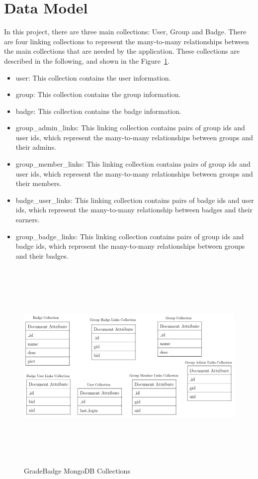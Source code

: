 \section{Data Model}
In this project, there are three main collections: User, Group and Badge.  There are four linking collections to represent the many-to-many relationships between the main collections that are needed by the application.  These collections are described in the following, and shown in the Figure~\ref{fig:db}. 

\begin{itemize}
\item user: This collection contains the user information.
\item group: This collection contains the group information.  
\item badge: This collection contains the badge information.
\item group{\_}admin{\_}links: This linking collection contains pairs of group ids and user ids, which represent the many-to-many relationships between groups and their admins.
\item group{\_}member{\_}links: This linking collection contains pairs of group ids and user ids, which represent the many-to-many relationships between groups and their members.
\item badge{\_}user{\_}links: This linking collection contains pairs of badge ids and user ids, which represent the many-to-many relationship between badges and their earners.
\item group{\_}badge{\_}links: This linking collection contains pairs of group ids and badge ids, which represent the many-to-many relationships between groups and their badges.
\end{itemize}

\vspace{3em}
\begin{figure}[H]
\begin{center}
\includegraphics[height=4.1in,width=6.5in]{images/ER.png}
\caption{GradeBadge MongoDB Collections }
\label{fig:db}
\end{center}
\end{figure}

